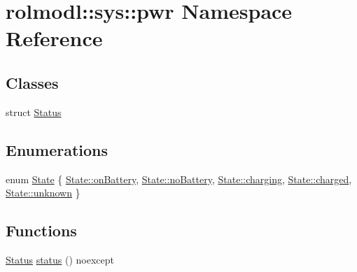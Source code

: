 \hypertarget{namespacerolmodl_1_1sys_1_1pwr}{}\section{rolmodl\+::sys\+::pwr Namespace Reference}
\label{namespacerolmodl_1_1sys_1_1pwr}
\subsection*{Classes}
\begin{DoxyCompactItemize}
\item 
struct \mbox{\hyperlink{structrolmodl_1_1sys_1_1pwr_1_1_status}{Status}}
\end{DoxyCompactItemize}
\subsection*{Enumerations}
\begin{DoxyCompactItemize}
\item 
enum \mbox{\hyperlink{namespacerolmodl_1_1sys_1_1pwr_ae84fe28ac28fdac077ff5363a4fc0dfb}{State}} \{ \newline
\mbox{\hyperlink{namespacerolmodl_1_1sys_1_1pwr_ae84fe28ac28fdac077ff5363a4fc0dfba22ae590543cf682ca4396b82e8b7bb66}{State\+::on\+Battery}}, 
\mbox{\hyperlink{namespacerolmodl_1_1sys_1_1pwr_ae84fe28ac28fdac077ff5363a4fc0dfba67ab8d3a2e4450771265ffcc3a21a45f}{State\+::no\+Battery}}, 
\mbox{\hyperlink{namespacerolmodl_1_1sys_1_1pwr_ae84fe28ac28fdac077ff5363a4fc0dfba05a0c26d8e746429c786c8e53378b9c9}{State\+::charging}}, 
\mbox{\hyperlink{namespacerolmodl_1_1sys_1_1pwr_ae84fe28ac28fdac077ff5363a4fc0dfba48aee20d947736a18c6e9d09b526f75a}{State\+::charged}}, 
\newline
\mbox{\hyperlink{namespacerolmodl_1_1sys_1_1pwr_ae84fe28ac28fdac077ff5363a4fc0dfbaad921d60486366258809553a3db49a4a}{State\+::unknown}}
 \}
\end{DoxyCompactItemize}
\subsection*{Functions}
\begin{DoxyCompactItemize}
\item 
\mbox{\hyperlink{structrolmodl_1_1sys_1_1pwr_1_1_status}{Status}} \mbox{\hyperlink{namespacerolmodl_1_1sys_1_1pwr_a5ba7d55c19eebf0f8c3deb904d814249}{status}} () noexcept
\end{DoxyCompactItemize}


